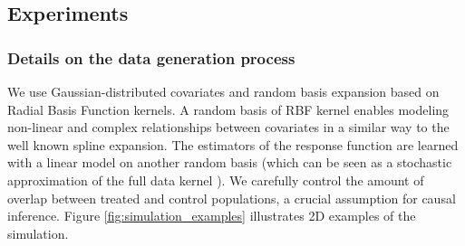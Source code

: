 \documentclass[a4paper,num-refs]{oup-contemporary}%
\begin{document}
\subsection{Experiments}

\subsubsection{Details on the data generation process}
\label{apd:experiments:generation}

We use Gaussian-distributed covariates and random basis expansion based on
Radial Basis Function kernels. A random basis of RBF kernel enables modeling
non-linear and complex relationships between covariates in a similar way to the
well known spline expansion. The estimators of the response function are learned
with a linear model on another random basis (which can be seen as a stochastic
approximation of the full data kernel \cite{rahimi_random_2008}). We carefully
control the amount of overlap between treated and control populations, a crucial
assumption for causal inference. Figure \ref{fig:simulation_examples}
illustrates 2D examples of the simulation.
\end{document}
